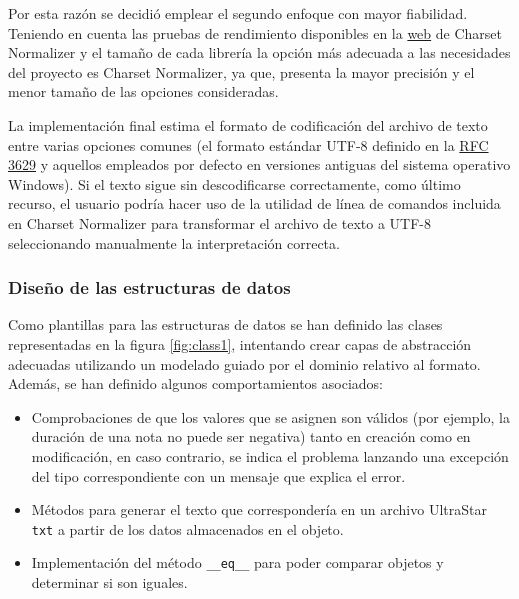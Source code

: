 Por esta razón se decidió emplear el segundo enfoque con mayor fiabilidad. Teniendo en cuenta las pruebas de rendimiento disponibles en la \href{https://github.com/Ousret/charset_normalizer}{web} de Charset Normalizer y el tamaño de cada librería la opción más adecuada a las necesidades del proyecto es Charset Normalizer, ya que, presenta la mayor precisión y el menor tamaño de las opciones consideradas.

La implementación final estima el formato de codificación del archivo de texto entre varias opciones comunes (el formato estándar UTF-8 definido en la \href{https://www.rfc-editor.org/rfc/rfc3629}{RFC 3629} y aquellos empleados por defecto en versiones antiguas del sistema operativo Windows). Si el texto sigue sin descodificarse correctamente, como último recurso, el usuario podría hacer uso de la utilidad de línea de comandos incluida en Charset Normalizer para transformar el archivo de texto a UTF-8 seleccionando manualmente la interpretación correcta.

\subsubsection{Diseño de las estructuras de datos}

Como plantillas para las estructuras de datos se han definido las clases representadas en la figura \ref{fig:class1}, intentando crear capas de abstracción adecuadas utilizando un modelado guiado por el dominio relativo al formato. Además, se han definido algunos comportamientos asociados:
\begin{itemize}
	\item{Comprobaciones de que los valores que se asignen son válidos (por ejemplo, la duración de una nota no puede ser negativa) tanto en creación como en modificación, en caso contrario, se indica el problema lanzando una excepción del tipo correspondiente con un mensaje que explica el error.}
	\item{Métodos para generar el texto que correspondería en un archivo UltraStar \texttt{txt} a partir de los datos almacenados en el objeto.}
	\item{Implementación del método \texttt{\_\_eq\_\_} para poder comparar objetos  y determinar si son iguales.}
\end{itemize}

